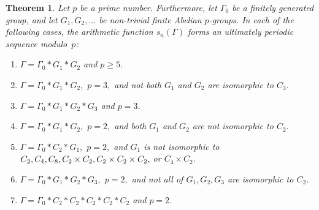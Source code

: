 \documentclass[12pt,reqno]{amsart}
\numberwithin{equation}{section}
\newtheorem{theorem}{Theorem}
\theoremstyle{remark}
\begin{document}
\begin{theorem} \label{thm:per}
Let $p$ be a prime number. Furthermore,
let $\Gamma_0$ be a finitely generated group, and let
$G_1,G_2,\dots$ be non-trivial finite Abelian $p$-groups. 
In each of the following cases,
the arithmetic function $s_n(\Gamma)$ forms
an ultimately periodic sequence modulo~$p$:

\begin{enumerate} 
\item $\Gamma=\Gamma_0*G_1*G_2$ and $p\ge5$.
\item $\Gamma=\Gamma_0*G_1*G_2,$ $p=3,$ and not both $G_1$ and $G_2$
are isomorphic to $C_3$.
\item $\Gamma=\Gamma_0*G_1*G_2*G_3$ and $p=3$.
\item $\Gamma=\Gamma_0*G_1*G_2,$ $p=2,$ and both
$G_1$ and $G_2$ are not isomorphic to $C_2$.
\item $\Gamma=\Gamma_0*C_2*G_1,$ $p=2,$ and $G_1$ is not isomorphic 
to $C_2,C_4,C_8,C_2\times C_2,\break C_2\times C_2\times C_2,$ or
$C_4\times C_2$.
\item $\Gamma=\Gamma_0*G_1*G_2*G_3,$ $p=2,$ and not all
of $G_1,G_2,G_3$ are isomorphic to $C_2$.
\item $\Gamma=\Gamma_0*C_2*C_2*C_2*C_2*C_2$ and $p=2$.
\end{enumerate}

\end{theorem}
\end{document}
